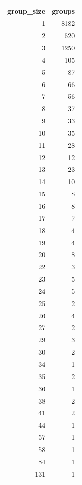 \begin{tabular}{rr}
\toprule
group_size & groups \\
\midrule
1 & 8182 \\
2 & 520 \\
3 & 1250 \\
4 & 105 \\
5 & 87 \\
6 & 66 \\
7 & 56 \\
8 & 37 \\
9 & 33 \\
10 & 35 \\
11 & 28 \\
12 & 12 \\
13 & 23 \\
14 & 10 \\
15 & 8 \\
16 & 8 \\
17 & 7 \\
18 & 4 \\
19 & 4 \\
20 & 8 \\
22 & 3 \\
23 & 5 \\
24 & 5 \\
25 & 2 \\
26 & 4 \\
27 & 2 \\
29 & 3 \\
30 & 2 \\
34 & 1 \\
35 & 2 \\
36 & 1 \\
38 & 2 \\
41 & 2 \\
44 & 1 \\
57 & 1 \\
58 & 1 \\
84 & 1 \\
131 & 1 \\
\bottomrule
\end{tabular}
